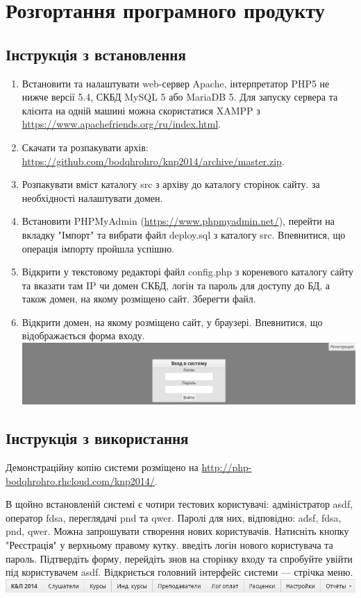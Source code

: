 \bigbreak
\section{Розгортання програмного продукту}
\subsection{Інструкція з встановлення}
\bigbreak
\begin{sloppy}
\begin{enumerate}
\item Встановити та налаштувати web-сервер Apache, інтерпретатор PHP5 не нижче версії 5.4, СКБД MySQL 5 або MariaDB 5. Для запуску сервера та клієнта на одній машині можна скористатися XAMPP з \url{https://www.apachefriends.org/ru/index.html}.
\item Скачати та розпакувати архів: \url{https://github.com/bodqhrohro/knp2014/archive/master.zip}.
\item Розпакувати вміст каталогу src з архіву до каталогу сторінок сайту. за необхідності налаштувати домен.
\item Встановити PHPMyAdmin (\url{https://www.phpmyadmin.net/}), перейти на вкладку "Імпорт" та вибрати файл deploy.sql з каталогу src. Впевнитися, що операція імпорту пройшла успішно.
\item Відкрити у текстовому редакторі файл config.php з кореневого каталогу сайту та вказати там IP чи домен СКБД, логін та пароль для доступу до БД, а також домен, на якому розміщено сайт. Зберегти файл.
\item Відкрити домен, на якому розміщено сайт, у браузері. Впевнитися, що відображається форма входу.\\\includegraphics[width=17cm]{scrns/login.png}
\end{enumerate}
\end{sloppy}
\bigbreak
\subsection{Інструкція з використання}
\bigbreak
Демонстраційну копію системи розміщено на \url{http://php-bodqhrohro.rhcloud.com/knp2014/}.

В щойно встановленій системі є чотири тестових користувачі: адміністратор asdf, оператор fdsa, переглядачі pnd та qwer. Паролі для них, відповідно: adsf, fdsa, pnd, qwer. Можна запрошувати створення нових користувачів. Натисніть кнопку "Реєстрація" у верхньому правому кутку. введіть логін нового користувача та пароль. Підтвердіть форму, перейдіть знов на сторінку входу та спробуйте увійти під користувачем asdf. Відкриється головний інтерфейс системи --- стрічка меню.
\\\includegraphics[width=17cm]{scrns/menu.png}

